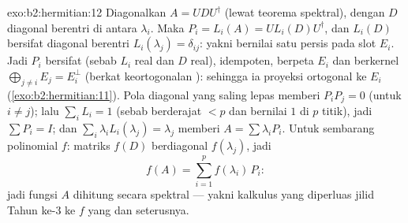 \begin{solution}{exo:b2:hermitian:12}
Diagonalkan $A = U D U^\dagger$ (lewat teorema spektral), dengan $D$ diagonal
berentri di antara $\lambda_i$. Maka $P_i = L_i(A) = U
L_i(D)U^\dagger$, dan $L_i(D)$ bersifat diagonal berentri
$L_i(\lambda_j) = \delta_{ij}$: yakni bernilai satu persis pada slot
$E_i$. Jadi $P_i$ bersifat  (sebab $L_i$ real dan $D$ real), idempoten,
berpeta $E_i$ dan berkernel $\bigoplus_{j\neq i}E_j = E_i^\perp$
(berkat keortogonalan ): sehingga ia proyeksi ortogonal ke
$E_i$ (\cref{exo:b2:hermitian:11}). Pola diagonal yang saling lepas
memberi $P_iP_j = 0$ (untuk $i \neq j$); lalu $\sum_i L_i = 1$ (sebab berderajat $< p$
dan bernilai $1$ di $p$ titik), jadi $\sum P_i = I$; dan $\sum_i
\lambda_iL_i(\lambda_j) = \lambda_j$ memberi $A = \sum
\lambda_iP_i$. Untuk sembarang polinomial $f$: matriks $f(D)$ berdiagonal
$f(\lambda_j)$, jadi
\[
f(A) = \sum_{i=1}^{p} f(\lambda_i)\,P_i :
\]
jadi fungsi $A$ dihitung secara spektral --- yakni kalkulus yang
diperluas jilid Tahun ke-3 ke $f$ yang  dan seterusnya.
\end{solution}

